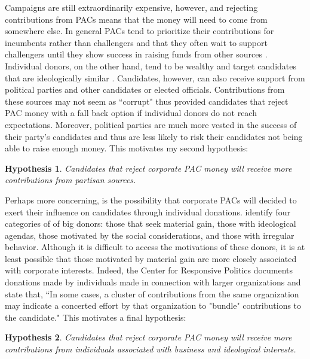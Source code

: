 \documentclass[12pt]{article}
\newtheorem{hyp}{Hypothesis}
\begin{document}
 Campaigns are still extraordinarily expensive, however, and rejecting contributions from PACs means that the money will need to come from somewhere else. In general PACs tend to prioritize their contributions for incumbents rather than challengers \citep{brunell_relationship_2005} and that they often wait to support challengers until they show success in raising funds from other sources \citep{biersack_seeds_1993}. Individual donors, on the other hand, tend to be wealthy \citep{brown_serious_1995} and target candidates that are ideologically similar \citep{bonica_mapping_2014}. Candidates, however, can also receive support from political parties and other candidates or elected officials. Contributions from these sources may not seem as ``corrupt" thus provided candidates that reject PAC money with a fall back option if individual donors do not reach expectations. Moreover, political parties are much more vested in the success of their party's candidates and thus are less likely to risk their candidates not being able to raise enough money. This motivates my second hypothesis:
 
 \begin{hyp}
 	Candidates that reject corporate PAC money will receive more contributions from partisan sources.  
 \end{hyp}
 
 Perhaps more concerning, is the possibility that corporate PACs will decided to exert their influence on candidates through individual donations. \citet{francia_financiers_2003} identify four categories of of big donors: those that seek material gain, those with ideological agendas, those motivated by the social considerations, and those with irregular behavior. Although it is difficult to access the motivations of these donors, it is at least possible that those motivated by material gain are more closely associated with corporate interests. Indeed, the Center for Responsive Politics documents donations made by individuals made in connection with larger organizations and state that, ``In some cases, a cluster of contributions from the same organization may indicate a concerted effort by that organization to "bundle" contributions to the candidate." This motivates a final hypothesis:
 
 \begin{hyp}
 	Candidates that reject corporate PAC money will receive more contributions from individuals associated with business and ideological interests. 
 \end{hyp}
 
\end{document}
